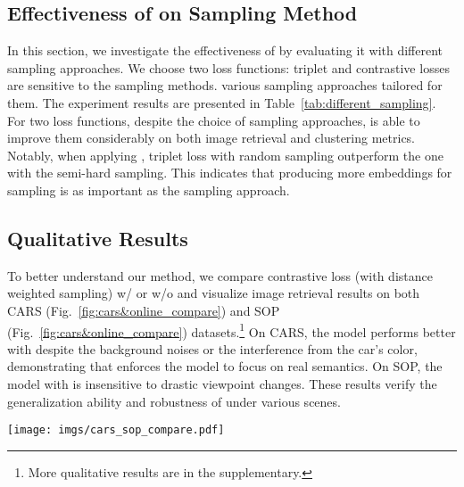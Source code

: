 \documentclass[runningheads]{llncs}
\begin{document}
\subsection{Effectiveness of \shortname on Sampling Method}
\label{sec:exp_sample}
In this section, we investigate the effectiveness of \shortname by evaluating it with different sampling approaches. We choose two  loss functions: triplet and contrastive losses  are sensitive to the sampling methods.  various sampling approaches  tailored for them. The experiment results are presented in Table~\ref{tab:different_sampling}. For two loss functions, despite the choice of sampling approaches, \shortname is able to improve them considerably on both image retrieval and clustering metrics. Notably, when applying \shortname, triplet loss with random sampling outperform the one with the semi-hard sampling. This indicates that producing more embeddings for sampling is as important as the sampling approach. 


\subsection{Qualitative Results}
\label{sec:exp_qualitative}
To better understand our method, we compare contrastive loss (with distance weighted sampling) w/ or w/o \shortname and visualize image retrieval results on both CARS (Fig.~\ref{fig:cars&online_compare}) and SOP (Fig.~\ref{fig:cars&online_compare}) datasets.\footnote{More qualitative results are in the supplementary.} On CARS, the model performs better with \shortname despite the background noises or the interference from the car's color, demonstrating that \shortname enforces the model to focus on real semantics. On SOP, the model with \shortname is insensitive to drastic viewpoint changes. These results verify the generalization ability and robustness of \shortname under various scenes.

\begin{figure*}[!h]
    \centering
    \texttt{[image: imgs/cars\_sop\_compare.pdf]}
    \caption{Top 3 retrieved results from the  trained w/ or w/o \shortname. \textcolor{corrected}{green} and \textcolor{wrong}{red} rectangles indicate desired and undesired results, respectively\fullstop}
    \label{fig:cars&online_compare}
\end{figure*}
\end{document}
